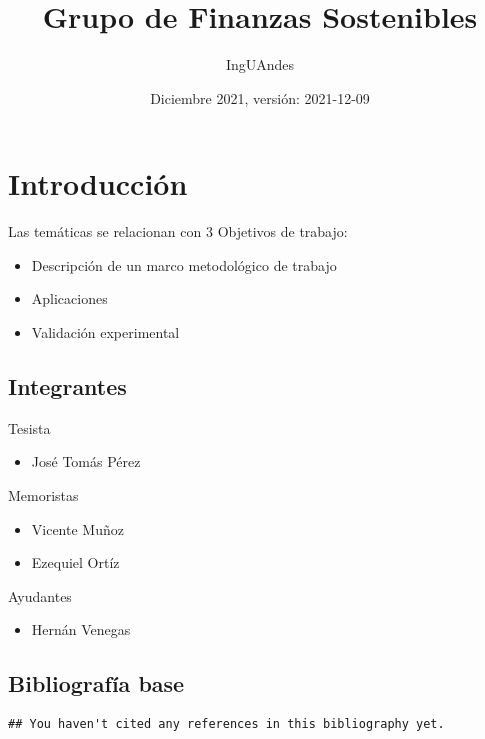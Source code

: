 \documentclass[]{book}
\title{Grupo de Finanzas Sostenibles}
\author{IngUAndes}
\date{Diciembre 2021, versión: 2021-12-09}
\providecommand{\tightlist}{%
  \setlength{\itemsep}{0pt}\setlength{\parskip}{0pt}}
\begin{document}
\maketitle

{
\setcounter{tocdepth}{1}
\tableofcontents
}
\chapter*{Introducción}\label{introducciuxf3n}

Las temáticas se relacionan con 3 Objetivos de trabajo:

\begin{itemize}
\tightlist
\item
  Descripción de un marco metodológico de trabajo
\item
  Aplicaciones
\item
  Validación experimental
\end{itemize}

\section*{Integrantes}\label{integrantes}

Tesista

\begin{itemize}
\tightlist
\item
  José Tomás Pérez
\end{itemize}

Memoristas

\begin{itemize}
\tightlist
\item
  Vicente Muñoz
\item
  Ezequiel Ortíz
\end{itemize}

Ayudantes

\begin{itemize}
\tightlist
\item
  Hernán Venegas
\end{itemize}

\section*{Bibliografía base}\label{bibliografuxeda-base}

\begin{verbatim}
## You haven't cited any references in this bibliography yet.
\end{verbatim}
\end{document}
